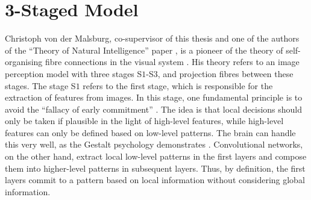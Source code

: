 \section{3-Staged Model}
Christoph von der Malsburg, co-supervisor of this thesis and one of the authors of the ``Theory of Natural Intelligence'' paper , is a pioneer of the theory of self-organising fibre connections in the visual system . His theory refers to an image perception model with three stages S$1$-S$3$, and projection fibres between these stages.
The stage S$1$ refers to the first stage, which is responsible for the extraction of features from images. In this stage, one fundamental principle is to avoid the ``fallacy of early commitment'' .
The idea is that local decisions should only be taken if plausible in the light of high-level features, while high-level features can only be defined based on low-level patterns.
The brain can handle this very well, as the Gestalt psychology demonstrates .
Convolutional networks, on the other hand, extract local low-level patterns in the first layers and compose them into higher-level patterns in subsequent layers. Thus, by definition, the first layers commit to a pattern based on local information without considering global information.

